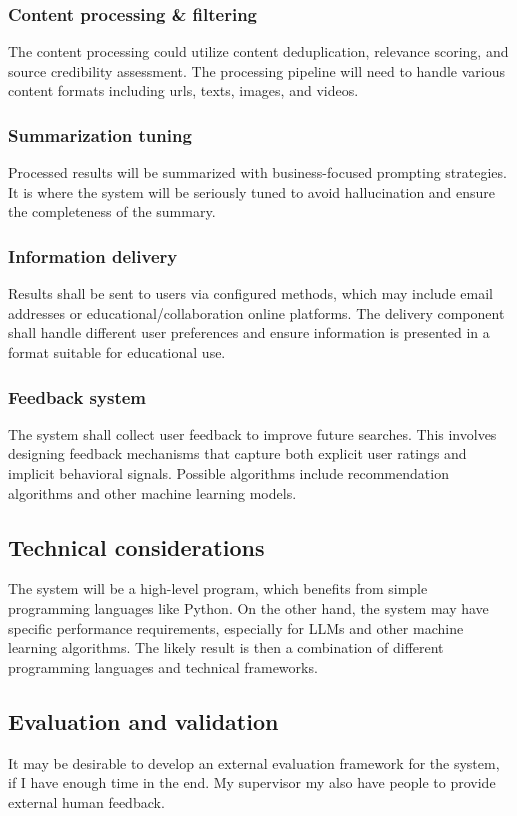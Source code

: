 \documentclass[project-plan]{report-template}
\begin{document}
\subsubsection{Content processing \& filtering} The content processing could
utilize content deduplication, relevance scoring, and source credibility
assessment.  The processing pipeline will need to handle various content
formats including urls, texts, images, and videos.

\subsubsection{Summarization tuning} Processed results will be summarized
with business-focused prompting strategies. It is where the system
will be seriously tuned to avoid hallucination and ensure the completeness of
the summary.

\subsubsection{Information delivery} Results shall be sent to users via
configured methods, which may include email addresses or
educational/collaboration online platforms. The delivery component shall handle
different user preferences and ensure information is presented in a format
suitable for educational use.

\subsubsection{Feedback system} The system shall collect user
feedback to improve
future searches. This involves designing feedback mechanisms that capture both
explicit user ratings and implicit behavioral signals. Possible algorithms
include recommendation algorithms and other machine learning models.

\subsection{Technical considerations} 
The system will be a high-level program, which benefits from simple programming
languages like Python. On the other hand, the system may have specific
performance requirements, especially for LLMs and other machine learning
algorithms. The likely result is then a combination of different programming
languages and technical frameworks.

\subsection{Evaluation and validation} 
It may be desirable to develop an external evaluation framework for the system,
if I have enough time in the end. My supervisor my also have people to provide
external human feedback.

\clearpage


\end{document}
